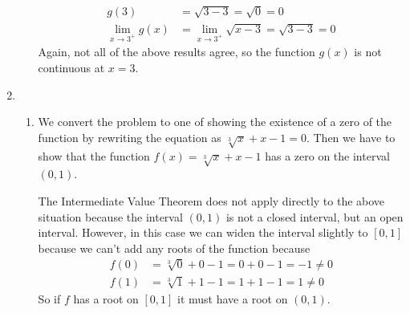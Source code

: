\documentclass{article}
\begin{document}
\begin{enumerate}
\begin{enumerate}
\begin{align*}
      g(3) &= \sqrt{3-3} = \sqrt{0} = 0 \\
      \lim_{x\to 3^+} g(x) &= \lim_{x\to 3^+} \sqrt{x-3} = \sqrt{3-3} = 0
    \end{align*}
    Again, not all of the above results agree, so the function $g(x)$
    is not continuous at $x=3$.
  \end{enumerate}
\item %
  \begin{enumerate}
  \item %
    We convert the problem to one of showing the existence of a zero
    of the function by rewriting the equation as
    $\sqrt[3]{x} +x - 1 = 0$.  Then we have to show that the function
    $f(x)=\sqrt[3]{x}+x-1$ has a zero on the interval $(0,1)$.

    The Intermediate Value Theorem does not apply directly to the
    above situation because the interval $(0,1)$ is not a closed
    interval, but an open interval.  However, in this case we can
    widen the interval slightly to $[0,1]$ because we can't add any
    roots of the function because
    \begin{align*}
      f(0) &= \sqrt[3]{0} + 0 - 1 = 0 + 0 - 1 = -1 \ne 0 \\
      f(1) &= \sqrt[3]{1} + 1 - 1 = 1 + 1 - 1 = 1 \ne 0
    \end{align*}
    So if $f$ has a root on $[0,1]$ it must have a root on $(0,1)$.


\end{enumerate}
\end{enumerate}
\end{document}
